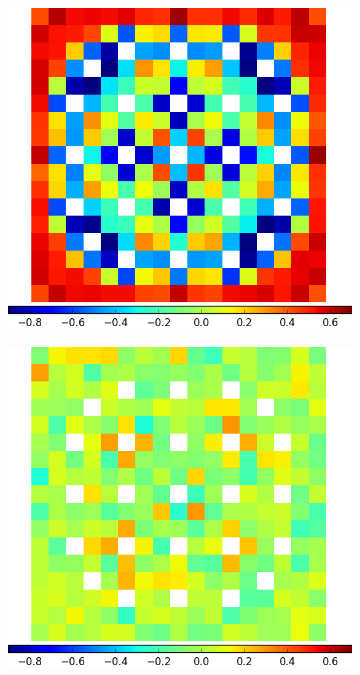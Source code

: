 \begin{figure}[h!]
\centering
\begin{subfigure}{0.45\textwidth}
  \centering
  \includegraphics[width=\linewidth]{figures/results/assm-31-20BPs/no-transform/capt-err-null}
  \caption{}
  \label{fig:chap11-assm-3.1-20BPs-capt-null}
\end{subfigure}%
\begin{subfigure}{0.45\textwidth}
  \centering
  \includegraphics[width=\linewidth]{figures/results/assm-31-20BPs/no-transform/capt-err-degenerate}

\end{subfigure}
\end{figure}
